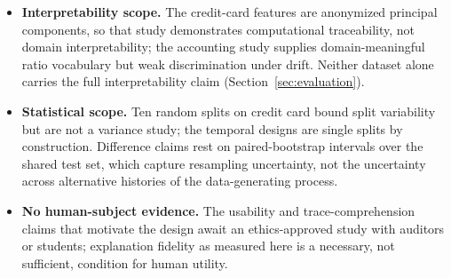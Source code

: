 \begin{itemize}
  models (the learned per-rule contribution is $z_r$ by
  construction, and Eq.~\ref{eq:noisyor-deletion} fixes the static
  deletion ranking), so those tables are implementation-concordance
  checks, not tests of a fallible ranking; the chained study is the
  only setting reported here where the trace ranking can actually
  fail, and its oracle-agreement rate is the number to quote.
  Absolute-probability deltas additionally
  compress for calibrated rare-event models
  (Section~\ref{sec:evaluation}); the rule-level and log-odds variants
  reported there are the appropriate instruments.
\item \textbf{Interpretability scope.} The credit-card features are
  anonymized principal components, so that study demonstrates
  computational traceability, not domain interpretability; the
  accounting study supplies domain-meaningful ratio vocabulary but weak
  discrimination under drift. Neither dataset alone carries the full
  interpretability claim (Section~\ref{sec:evaluation}).
\item \textbf{Statistical scope.} Ten random splits on credit card
  bound split variability but are not a variance study; the temporal
  designs are single splits by construction. Difference claims rest on
  paired-bootstrap intervals over the shared test set, which capture
  resampling uncertainty, not the uncertainty across alternative
  histories of the data-generating process.
\item \textbf{No human-subject evidence.} The usability and
  trace-comprehension claims that motivate the design await an
  ethics-approved study with auditors or students; explanation fidelity
  as measured here is a necessary, not sufficient, condition for human
  utility.
\end{itemize}
